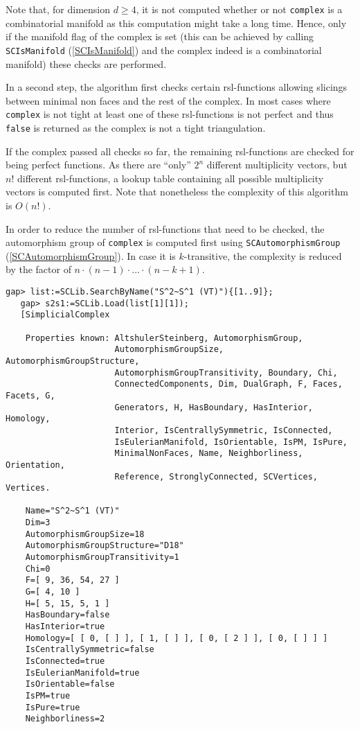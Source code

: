 \documentclass[a4paper,11pt]{report}
\begin{document}
{{{ Note that, for dimension $d \geq 4$, it is not computed whether or not \texttt{complex} is a combinatorial manifold as this computation might take a long time. Hence,
only if the manifold flag of the complex is set (this can be achieved by
calling \texttt{SCIsManifold} (\ref{SCIsManifold}) and the complex indeed is a combinatorial manifold) these checks are
performed.

 In a second step, the algorithm first checks certain rsl-functions allowing
slicings between minimal non faces and the rest of the complex. In most cases
where \texttt{complex} is not tight at least one of these rsl-functions is not perfect and thus \texttt{false} is returned as the complex is not a tight triangulation.

 If the complex passed all checks so far, the remaining rsl-functions are
checked for being perfect functions. As there are ``only'' $2^n$ different multiplicity vectors, but $n!$ different rsl-functions, a lookup table containing all possible multiplicity
vectors is computed first. Note that nonetheless the complexity of this
algorithm is $O(n!)$.

 In order to reduce the number of rsl-functions that need to be checked, the
automorphism group of \texttt{complex} is computed first using \texttt{SCAutomorphismGroup} (\ref{SCAutomorphismGroup}). In case it is $k$-transitive, the complexity is reduced by the factor of $n \cdot (n-1) \cdot \dots \cdot (n-k+1)$. 
\begin{Verbatim}[commandchars=!@|,fontsize=\small,frame=single,label=Example]
   gap> list:=SCLib.SearchByName("S^2~S^1 (VT)"){[1..9]};
   gap> s2s1:=SCLib.Load(list[1][1]);
   [SimplicialComplex
   
    Properties known: AltshulerSteinberg, AutomorphismGroup, 
                      AutomorphismGroupSize, AutomorphismGroupStructure, 
                      AutomorphismGroupTransitivity, Boundary, Chi, 
                      ConnectedComponents, Dim, DualGraph, F, Faces, Facets, G, 
                      Generators, H, HasBoundary, HasInterior, Homology, 
                      Interior, IsCentrallySymmetric, IsConnected, 
                      IsEulerianManifold, IsOrientable, IsPM, IsPure, 
                      MinimalNonFaces, Name, Neighborliness, Orientation, 
                      Reference, StronglyConnected, SCVertices, Vertices.
   
    Name="S^2~S^1 (VT)"
    Dim=3
    AutomorphismGroupSize=18
    AutomorphismGroupStructure="D18"
    AutomorphismGroupTransitivity=1
    Chi=0
    F=[ 9, 36, 54, 27 ]
    G=[ 4, 10 ]
    H=[ 5, 15, 5, 1 ]
    HasBoundary=false
    HasInterior=true
    Homology=[ [ 0, [ ] ], [ 1, [ ] ], [ 0, [ 2 ] ], [ 0, [ ] ] ]
    IsCentrallySymmetric=false
    IsConnected=true
    IsEulerianManifold=true
    IsOrientable=false
    IsPM=true
    IsPure=true
    Neighborliness=2
   

\end{Verbatim}}}}
\end{document}
